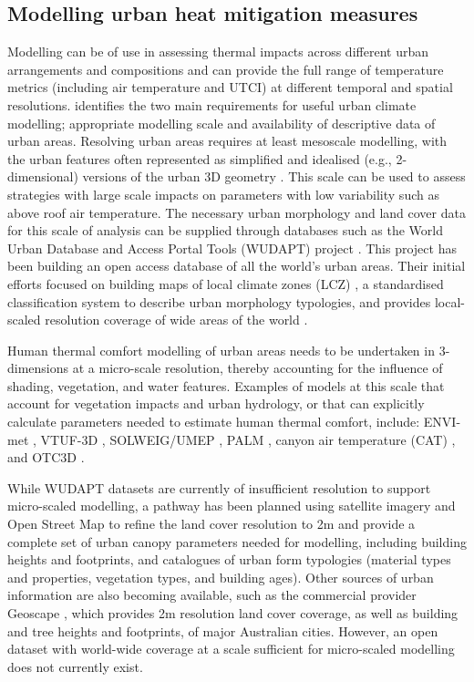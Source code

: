 \documentclass[final,3p,times,authoryear]{elsarticle}
\begin{document}
\subsection{Modelling urban heat mitigation measures}

Modelling can be of use in assessing thermal impacts across different urban arrangements and compositions and can provide the full range of temperature metrics (including air temperature and UTCI) at different temporal and spatial resolutions. \cite{Masson2020} identifies the two main requirements for useful urban climate modelling; appropriate modelling scale and availability of descriptive data of urban areas. Resolving urban areas requires at least mesoscale modelling, with the urban features often represented as simplified and idealised (e.g., 2-dimensional) versions of the urban 3D geometry \citep{Masson2005}. This scale can be used to assess strategies with large scale impacts on parameters with low variability such as above roof air temperature. The necessary urban morphology and land cover data for this scale of analysis can be supplied through databases such as the World Urban Database and Access Portal Tools (WUDAPT) project \citep{Ching2018a}. This project has been building an open access database of all the world's urban areas. Their initial efforts focused on building maps of local climate zones (LCZ) \citep{Stewart2012b}, a standardised classification system to describe urban morphology typologies, and provides local-scaled resolution coverage of wide areas of the world \citep{Demuzere2019}.


Human thermal comfort modelling of urban areas needs to be undertaken in 3-dimensions at a micro-scale resolution, thereby accounting for the influence of shading, vegetation, and water features. Examples of models at this scale that account for vegetation impacts and urban hydrology, or that can explicitly calculate parameters needed to estimate human thermal comfort, include: ENVI-met \citep{Bruse1999}, VTUF-3D \citep{Nice2018a}, SOLWEIG/UMEP \citep{Lindberg2018}, PALM \citep{Dominik2019}, canyon air temperature (CAT) \citep{Erell2006}, and OTC3D \citep{Nazarian2018}. 

While WUDAPT datasets are currently of insufficient resolution to support micro-scaled modelling, a pathway has been planned \citep{Ching2019} using satellite imagery and Open Street Map to refine the land cover resolution to 2m and provide a complete set of urban canopy parameters needed for modelling, including building heights and footprints, and catalogues of urban form typologies (material types and properties, vegetation types, and building ages). Other sources of urban information are also becoming available, such as the commercial provider Geoscape \citep{Geoscape2020}, which provides 2m resolution land cover coverage, as well as building and tree heights and footprints, of major Australian cities. However, an open dataset with world-wide coverage at a scale sufficient for micro-scaled modelling does not currently exist. 
\end{document}
